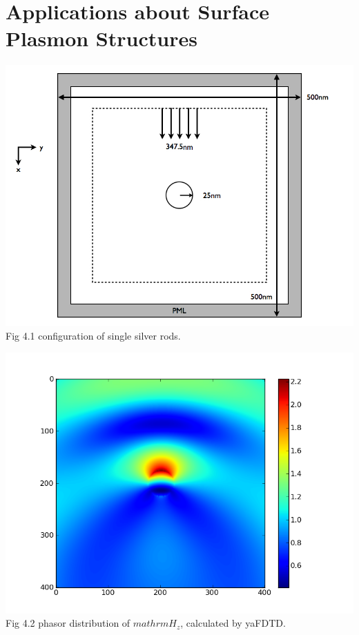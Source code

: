 \documentclass[openany]{book}
\begin{document}
\chapter{Applications about Surface Plasmon Structures}


\clearpage
\begin{center}
\includegraphics[scale=0.5]{images/single-rod-config.jpg}\\
Fig 4.1
configuration of single silver rods.
\end{center}
\begin{center}
\includegraphics[scale=0.8]{images/phasor-exam-fdtd.png}\\
Fig 4.2
phasor distribution of $mathrm{H_z}$, calculated by yaFDTD.
\end{center}
\end{document}
